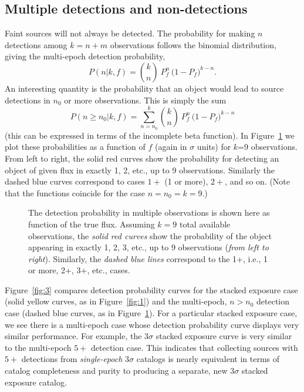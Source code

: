 \documentclass[twocolumn]{emulateapj}
\begin{document}
\subsection{Multiple detections and non-detections}
\noindent
%
Faint sources will not always be detected.
%
The probability for making $n$ detections among \mbox{$k=n+m$} observations follows the binomial distribution, giving the multi-epoch detection probability,
%
\begin{equation} \label{eq:binomial}
 P(n|k,f) = {k \choose n}\ P_f^n\,\big(1\!-\!P_f\big)^{k-n}.
\end{equation}
%
An interesting quantity is the probability that an object would lead to source detections in $n_0$ or more observations.
This is simply the sum
\begin{equation}
P(n\!\geq{}\!n_0|k,f) = \sum_{n=n_0}^k {k \choose n}\ P_f^n\,\big(1\!-\!P_f\big)^{k-n}
\end{equation}
%
(this can be expressed in terms of the incomplete beta function).
In Figure~\ref{fig:2} we plot these probabilities as a function of $f$ (again in $\sigma$ units) for \mbox{$k$=9} observations.
From left to right, the solid red curves show the probability for detecting an object of given flux in exactly 1, 2, etc., up to 9 observations.
Similarly the dashed blue curves correspond to cases $1+$ (1 or more), $2+$, and so on.
(Note that the functions coincide for the case $n=n_0=k=9$.)

\begin{figure}
\caption{The detection probability in multiple observations is shown here as function of the true flux. Assuming \mbox{$k\!=\!9$} total available observations, the {\it{}solid red curves} show the probability of the object appearing in exactly 1, 2, 3, etc., up to 9 observations ({\it{}from left to right}). Similarly, the {\it{}dashed blue lines} correspond to the 1+, i.e., 1 or more, 2+, 3+, etc., cases.}
\label{fig:2}
\end{figure}


Figure~\ref{fig:3} compares detection probability curves for the stacked exposure case (solid yellow curves, as in Figure~\ref{fig:1}) and the multi-epoch, $n>n_0$ detection case (dashed blue curves, as in Figure~\ref{fig:2}).
For a particular stacked exposure case, we see there is a multi-epoch case whose detection probability curve displays very similar performance.
For example, the $3\sigma$ stacked exposure curve is very similar to the multi-epoch $5+$ detection case.
This indicates that collecting sources with $5+$ detections from \emph{single-epoch} $3\sigma$ catalogs is nearly equivalent in terms of catalog completeness and purity to producing a separate, new $3\sigma$ stacked exposure catalog.
%
\end{document}
